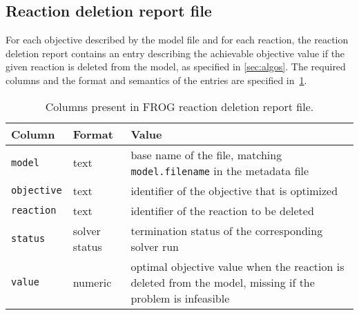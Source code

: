 \subsection{Reaction deletion report file}
\label{sec:rxns}

For each objective described by the model file and for each reaction, the reaction deletion report contains an entry describing the achievable objective value if the given reaction is deleted from the model, as specified in \cref{sec:algos}. The required columns and the format and semantics of the entries are specified in~\cref{tab:rxnsfields}.

\begin{table}\tablefont
\begin{tabular}{llp{30em}}
\toprule
Column & Format & Value \\
\midrule
\verb|model|
 & text
 & base name of the file, matching \verb|model.filename| in the metadata file
 \\
\verb|objective|
 & text
 & identifier of the objective that is optimized
 \\
\verb|reaction|
 & text
 & identifier of the reaction to be deleted
 \\
\verb|status|
 & solver status
 & termination status of the corresponding solver run
 \\
\verb|value|
 & numeric
 & optimal objective value when the reaction is deleted from the model, missing if the problem is infeasible
 \\
\bottomrule
\end{tabular}
\caption{Columns present in FROG reaction deletion report file.}
\label{tab:rxnsfields}
\end{table}
